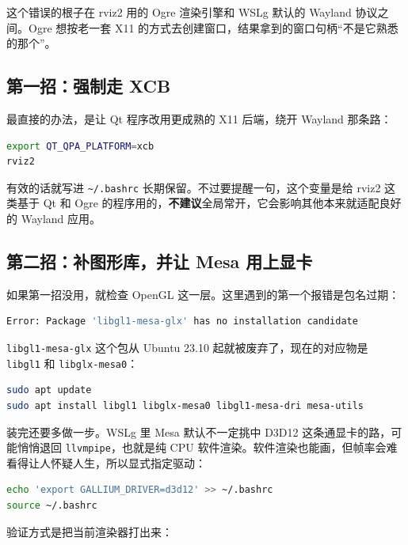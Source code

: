 \documentclass[12pt,a4paper]{ctexbook}
\begin{document}
这个错误的根子在 rviz2 用的 Ogre 渲染引擎和 WSLg 默认的 Wayland 协议之间。Ogre 想按老一套 X11 的方式去创建窗口，结果拿到的窗口句柄``不是它熟悉的那个''。

\subsection{第一招：强制走 XCB}

最直接的办法，是让 Qt 程序改用更成熟的 X11 后端，绕开 Wayland 那条路：

\begin{lstlisting}[language=bash,title={强制使用 XCB 后端}]
export QT_QPA_PLATFORM=xcb
rviz2
\end{lstlisting}

有效的话就写进 \verb|~/.bashrc| 长期保留。不过要提醒一句，这个变量是给 rviz2 这类基于 Qt 和 Ogre 的程序用的，\textbf{不建议}全局常开，它会影响其他本来就适配良好的 Wayland 应用。

\subsection{第二招：补图形库，并让 Mesa 用上显卡}

如果第一招没用，就检查 OpenGL 这一层。这里遇到的第一个报错是包名过期：

\begin{lstlisting}[language=bash,title={libgl1-mesa-glx 已经不存在了}]
Error: Package 'libgl1-mesa-glx' has no installation candidate
\end{lstlisting}

\verb|libgl1-mesa-glx| 这个包从 Ubuntu 23.10 起就被废弃了，现在的对应物是 \verb|libgl1| 和 \verb|libglx-mesa0|：

\begin{lstlisting}[language=bash,title={正确的包名}]
sudo apt update
sudo apt install libgl1 libglx-mesa0 libgl1-mesa-dri mesa-utils
\end{lstlisting}

装完还要多做一步。WSLg 里 Mesa 默认不一定挑中 D3D12 这条通显卡的路，可能悄悄退回 \verb|llvmpipe|，也就是纯 CPU 软件渲染。软件渲染也能画，但帧率会难看得让人怀疑人生，所以显式指定驱动：

\begin{lstlisting}[language=bash,title={让 Mesa 走 D3D12}]
echo 'export GALLIUM_DRIVER=d3d12' >> ~/.bashrc
source ~/.bashrc
\end{lstlisting}

验证方式是把当前渲染器打出来：
\end{document}
